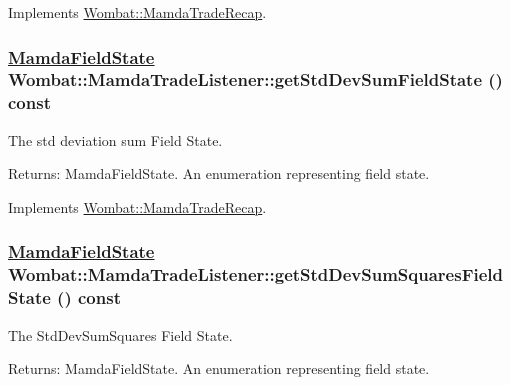 Implements \hyperlink{classWombat_1_1MamdaTradeRecap_0555b4b9265d2aecd14660dacd6e8bf3}{Wombat::Mamda\-Trade\-Recap}.\hypertarget{classWombat_1_1MamdaTradeListener_2daad489d3cda802d7555b5f9edc0822}{
\subsubsection[getStdDevSumFieldState]{\setlength{\rightskip}{0pt plus 5cm}\hyperlink{namespaceWombat_93aac974f2ab713554fd12a1fa3b7d2a}{Mamda\-Field\-State} Wombat::Mamda\-Trade\-Listener::get\-Std\-Dev\-Sum\-Field\-State () const}}
\label{classWombat_1_1MamdaTradeListener_2daad489d3cda802d7555b5f9edc0822}


The std deviation sum Field State. 

\begin{Desc}
\item[Returns:]Mamda\-Field\-State. An enumeration representing field state. \end{Desc}


Implements \hyperlink{classWombat_1_1MamdaTradeRecap_301b9d3bf67f823437080caa7dbd0804}{Wombat::Mamda\-Trade\-Recap}.\hypertarget{classWombat_1_1MamdaTradeListener_b14aa9b55ac04672085cd7135cb5868c}{
\subsubsection[getStdDevSumSquaresFieldState]{\setlength{\rightskip}{0pt plus 5cm}\hyperlink{namespaceWombat_93aac974f2ab713554fd12a1fa3b7d2a}{Mamda\-Field\-State} Wombat::Mamda\-Trade\-Listener::get\-Std\-Dev\-Sum\-Squares\-Field\-State () const}}
\label{classWombat_1_1MamdaTradeListener_b14aa9b55ac04672085cd7135cb5868c}


The Std\-Dev\-Sum\-Squares Field State. 

\begin{Desc}
\item[Returns:]Mamda\-Field\-State. An enumeration representing field state. \end{Desc}


